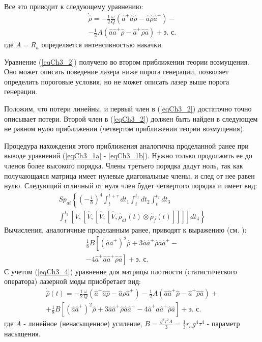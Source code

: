 Все это приводит к следующему уравнению:
\begin{eqnarray}
\dot{\hat{\rho}} =
- \frac{1}{2}\frac{\omega}{Q}
\left(\hat{a}^{+}\hat{a}\hat{\rho} - 
\hat{a}\hat{\rho}\hat{a}^{+}
\right)
-
\nonumber \\
- \frac{1}{2}A
\left(\hat{a}\hat{a}^{+}\hat{\rho} - 
\hat{a}^{+}\hat{\rho}\hat{a}
\right)
 + \mbox{э. с.}
\label{eqCh3_2}
\end{eqnarray}
где $A = R_a$ определяется интенсивностью накачки.

Уравнение (\ref{eqCh3_2}) получено во втором приближении теории
возмущения. Оно может описать поведение лазера ниже
порога генерации, позволяет определить пороговые условия, но не может
описать лазер выше порога генерации.  

Положим, что потери линейны, и первый член в (\ref{eqCh3_2})
достаточно точно описывает потери. Второй член в (\ref{eqCh3_2}) должен быть
найден в следующем не равном нулю приближении (четвертом приближении
теории возмущения).
 
Процедура нахождения этого приближения аналогична проделанной ранее
при выводе уравнений (\ref{eqCh3_1a} - \ref{eqCh3_1b}). Нужно только
продолжить ее до членов более высокого порядка. Члены третьего порядка
дадут ноль, так как получающаяся матрица имеет нулевые диагональные
члены, и след от нее равен нулю. Следующий отличный от нуля член будет 
четвертого порядка и имеет вид: 
\begin{eqnarray}
Sp_{at}\left\{
\left(-\frac{i}{\hbar}\right)^4
\int_t^{t+\tau}dt_1
\int_t^{t_1}dt_2
\int_t^{t_2}dt_3
\right.
\nonumber \\
\left.
\int_t^{t_3}
\left[\hat{V},
\left[\hat{V},
\left[\hat{V},
\left[\hat{V},
\hat{\rho}_{at}\left(t\right)
\otimes
\hat{\rho}_{f}\left(t\right)
\right]
\right]
\right]
\right]
dt_4
\right\}
\label{eqCh3_3}
\end{eqnarray}
Вычисления, аналогичные проделанным ранее, приводят к выражению
(см. \cite{bMandel2000}):
\begin{eqnarray}
\frac{1}{8}B\left[
\left(\hat{a} \hat{a}^{+}\right)^2\hat{\rho}
+ 3 \hat{a} \hat{a}^{+} \hat{\rho} \hat{a} \hat{a}^{+} -
\right.
\nonumber \\
\left.
-
4 \hat{a}^{+} \hat{a} \hat{a}^{+} \hat{\rho} \hat{a}
\right] + \mbox{э. с.}
\label{eqCh3_4}
\end{eqnarray}
С учетом (\ref{eqCh3_4}) уравнение для матрицы плотности
(статистического оператора) лазерной моды приобретает вид: 
\begin{eqnarray}
\dot{\hat{\rho}}\left(t\right) = 
- \frac{1}{2}\frac{\omega}{Q}
\left(\hat{a}^{+}\hat{a}\hat{\rho} - 
\hat{a}\hat{\rho}\hat{a}^{+}
\right)
- \frac{1}{2}A
\left(\hat{a}\hat{a}^{+}\hat{\rho} - 
\hat{a}^{+}\hat{\rho}\hat{a}
\right) + 
\nonumber \\
+ \frac{1}{8}B\left[
\left(\hat{a} \hat{a}^{+}\right)^2\hat{\rho}
+ 3 \hat{a} \hat{a}^{+} \hat{\rho} \hat{a} \hat{a}^{+} -
4 \hat{a}^{+} \hat{a} \hat{a}^{+} \hat{\rho} \hat{a}
\right] + \mbox{э. с.}
\label{eqCh3_5}
\end{eqnarray}
где $A$ - линейное (ненасыщенное) усиление, 
$B=\frac{g^2 \tau^2 A}{3} = \frac{1}{3}r_ag^4\tau^4$ - параметр
насыщения.

